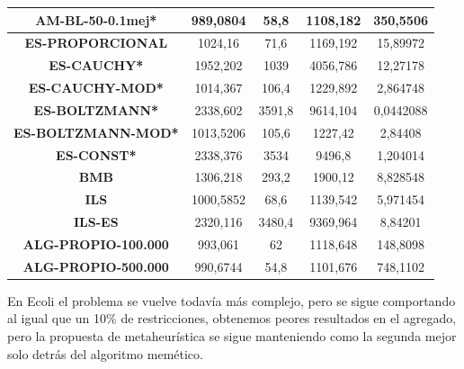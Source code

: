 \documentclass[12pt, spanish]{article}
\begin{document}
\begin{table}[H]
\begin{tabular}{|c|c|c|c|c|}
\textbf{AM-BL-50-0.1mej*}   & 989,0804                  & 58,8                        & 1108,182               & 350,5506   \\ \hline
\textbf{ES-PROPORCIONAL}    & 1024,16                   & 71,6                        & 1169,192               & 15,89972   \\ \hline
\textbf{ES-CAUCHY*}         & 1952,202                  & 1039                        & 4056,786               & 12,27178   \\ \hline
\textbf{ES-CAUCHY-MOD*}     & 1014,367                  & 106,4                       & 1229,892               & 2,864748   \\ \hline
\textbf{ES-BOLTZMANN*}      & 2338,602                  & 3591,8                      & 9614,104               & 0,0442088  \\ \hline
\textbf{ES-BOLTZMANN-MOD*}  & 1013,5206                 & 105,6                       & 1227,42                & 2,84408    \\ \hline
\textbf{ES-CONST*}          & 2338,376                  & 3534                        & 9496,8                 & 1,204014   \\ \hline
\textbf{BMB}                & 1306,218                  & 293,2                       & 1900,12                & 8,828548   \\ \hline
\textbf{ILS}                & 1000,5852                 & 68,6                        & 1139,542               & 5,971454   \\ \hline
\textbf{ILS-ES}             & 2320,116                  & 3480,4                      & 9369,964               & 8,84201    \\ \hline
\textbf{ALG-PROPIO-100.000} & 993,061                   & 62                          & 1118,648               & 148,8098   \\ \hline
\textbf{ALG-PROPIO-500.000} & 990,6744                  & 54,8                        & 1101,676               & 748,1102   \\ \hline
\end{tabular}
\end{table}


En Ecoli el problema se vuelve todavía más complejo, pero se sigue comportando al igual que un 10\% de restricciones, obtenemos peores resultados en el agregado, pero la propuesta de metaheurística se sigue manteniendo como la segunda mejor solo detrás del algoritmo memético.
\end{document}
